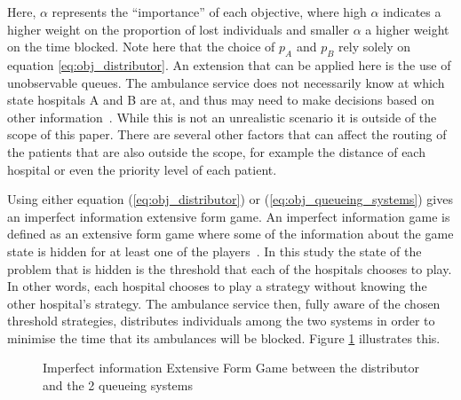 Here, \(\alpha\) represents the ``importance'' of each objective,
where high \(\alpha\) indicates a higher weight on the proportion of lost 
individuals and smaller \(\alpha\) a higher weight on the time blocked. 
Note here that the choice of \(p_A\) and \(p_B\) rely solely on equation
\ref{eq:obj_distributor}.
An extension that can be applied here is the use of unobservable queues.
The ambulance service does not necessarily know at which state hospitals A and
B are at, and thus may need to make decisions based on other
information~\cite{unobservablequeue}.
While this is not an unrealistic scenario it is outside of the scope of this
paper.
There are several other factors that can affect the routing of the patients 
that are also outside the scope, for example the distance of each hospital or
even the priority level of each patient.

Using either equation (\ref{eq:obj_distributor}) or 
(\ref{eq:obj_queueing_systems}) gives an imperfect information extensive form 
game. 
An imperfect information game is defined as an extensive form game where some 
of the information about the game state is hidden for at least one of the 
players~\cite{Berwanger2008}. In this study the state of the problem that is
hidden is the threshold that each of the hospitals chooses to play.
In other words, each hospital chooses to play a strategy without 
knowing the other hospital's strategy.
The ambulance service then, fully aware of the chosen threshold strategies, 
distributes individuals among the two systems in order to minimise the time 
that its ambulances will be blocked. 
Figure \ref{fig:imperfect_info_game} illustrates this. 

\begin{figure}[ht]
    \centering
    \caption{Imperfect information Extensive Form Game between the distributor 
    and the 2 queueing systems}
    \label{fig:imperfect_info_game}
\end{figure}

